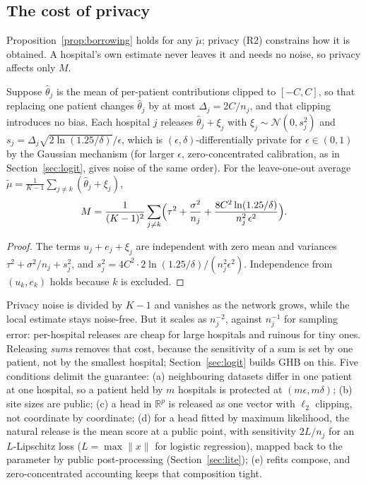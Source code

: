 \documentclass[acmsmall,screen,review]{acmart}
\theoremstyle{acmdefinition}
\begin{document}
\subsection{The cost of privacy}\label{sec:privacy}

Proposition~\ref{prop:borrowing} holds for any $\tilde{\mu}$; privacy (R2) constrains how it is obtained. A hospital's own estimate never leaves it and needs no noise, so privacy affects only $M$.

\begin{proposition}\label{prop:privatized}
Suppose $\hat{\theta}_j$ is the mean of per-patient contributions clipped to $[-C,C]$, so that replacing one patient changes $\hat{\theta}_j$ by at most $\Delta_j=2C/n_j$, and that clipping introduces no bias. Each hospital $j$ releases $\hat{\theta}_j+\xi_j$ with $\xi_j\sim\mathcal{N}(0,s_j^2)$ and $s_j=\Delta_j\sqrt{2\ln(1.25/\delta)}/\epsilon$, which is $(\epsilon,\delta)$-differentially private for $\epsilon\in(0,1)$ by the Gaussian mechanism \cite{dwork2014algorithmic} (for larger $\epsilon$, zero-concentrated calibration, as in Section~\ref{sec:logit}, gives noise of the same order). For the leave-one-out average $\tilde{\mu}=\frac{1}{K-1}\sum_{j\neq k}(\hat{\theta}_j+\xi_j)$,
\begin{equation}\label{eq:M}
M=\frac{1}{(K-1)^2}\sum_{j\neq k}\Bigl(\tau^2+\frac{\sigma^2}{n_j}+\frac{8C^2\ln(1.25/\delta)}{n_j^2\,\epsilon^2}\Bigr).
\end{equation}
\end{proposition}

\begin{proof}
The terms $u_j+e_j+\xi_j$ are independent with zero mean and variances $\tau^2+\sigma^2/n_j+s_j^2$, and $s_j^2=4C^2\cdot 2\ln(1.25/\delta)/(n_j^2\epsilon^2)$. Independence from $(u_k,e_k)$ holds because $k$ is excluded.
\end{proof}

Privacy noise is divided by $K-1$ and vanishes as the network grows, while the local estimate stays noise-free. But it scales as $n_j^{-2}$, against $n_j^{-1}$ for sampling error: per-hospital releases are cheap for large hospitals and ruinous for tiny ones. Releasing \emph{sums} removes that cost, because the sensitivity of a sum is set by one patient, not by the smallest hospital; Section~\ref{sec:logit} builds GHB on this. Five conditions delimit the guarantee: (a) neighbouring datasets differ in one patient at one hospital, so a patient held by $m$ hospitals is protected at $(m\epsilon,m\delta)$; (b) site sizes are public; (c) a head in $\mathbb{R}^p$ is released as one vector with $\ell_2$ clipping, not coordinate by coordinate; (d) for a head fitted by maximum likelihood, the natural release is the mean score at a public point, with sensitivity $2L/n_j$ for an $L$-Lipschitz loss ($L=\max\|x\|$ for logistic regression), mapped back to the parameter by public post-processing (Section~\ref{sec:lite}); (e) refits compose, and zero-concentrated accounting \cite{bun2016concentrated} keeps that composition tight.
\end{document}
